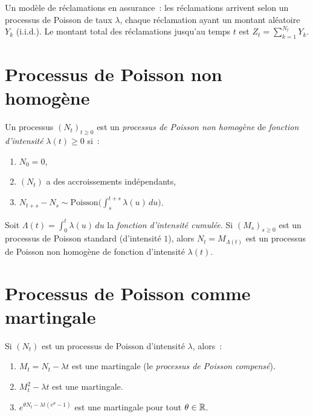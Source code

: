 \begin{exemple}
Un mod\`ele de r\'eclamations en assurance~: les r\'eclamations arrivent selon un
processus de Poisson de taux $\lambda$, chaque r\'eclamation ayant un montant
al\'eatoire $Y_k$ (i.i.d.). Le montant total des r\'eclamations jusqu'au temps $t$
est $Z_t = \sum_{k=1}^{N_t} Y_k$.
\end{exemple}

\section{Processus de Poisson non homog\`ene}

\begin{definition}
Un processus $(N_t)_{t \geq 0}$ est un \emph{processus de Poisson non homog\`ene}
de \emph{fonction d'intensit\'e} $\lambda(t) \geq 0$ si~:
\begin{enumerate}
  \item $N_0 = 0$,
  \item $(N_t)$ a des accroissements ind\'ependants,
  \item $N_{t+s} - N_s \sim \text{Poisson}\bigl(\int_s^{t+s} \lambda(u) \, du\bigr)$.
\end{enumerate}
\end{definition}

\begin{proposition}
Soit $\Lambda(t) = \int_0^t \lambda(u) \, du$ la \emph{fonction d'intensit\'e
cumul\'ee}. Si $(M_s)_{s \geq 0}$ est un processus de Poisson standard
(d'intensit\'e $1$), alors $N_t = M_{\Lambda(t)}$ est un processus de Poisson
non homog\`ene de fonction d'intensit\'e $\lambda(t)$.
\end{proposition}

\section{Processus de Poisson comme martingale}

\begin{proposition}
\label{prop:poisson_martingale}
Si $(N_t)$ est un processus de Poisson d'intensit\'e $\lambda$, alors~:
\begin{enumerate}
  \item $M_t = N_t - \lambda t$ est une martingale (le \emph{processus de Poisson compens\'e}).
  \item $M_t^2 - \lambda t$ est une martingale.
  \item $e^{\theta N_t - \lambda t(e^{\theta} - 1)}$ est une martingale pour tout $\theta \in \mathbb{R}$.
\end{enumerate}
\end{proposition}


